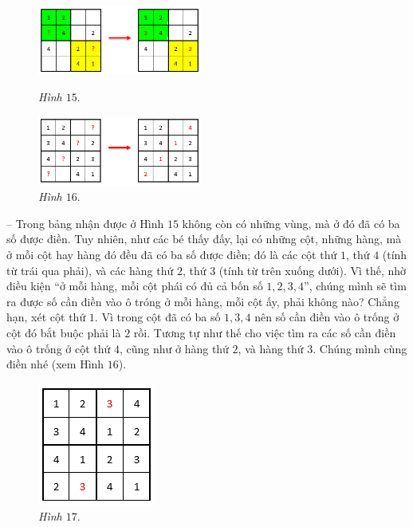 		\begin{figure}
			\centering
			\captionsetup{labelformat= empty, justification=centering}
			\includegraphics[width=0.48\textwidth]{pic4}
			\caption{\small\textit{Hình $15.$}}
			
			\includegraphics[width=0.48\textwidth]{pic5}
			\caption{\small\textit{Hình $16.$}}
			\vspace*{-10pt}
		\end{figure}
	-- Trong bảng nhận được ở Hình $15$ không còn có những vùng, mà ở đó đã có ba số được điền. Tuy nhiên, như các bé thấy đấy, lại có những cột, những hàng, mà ở mỗi cột hay hàng đó đều đã có ba số được điền; đó là các cột thứ $1$, thứ $4$ (tính từ trái qua phải), và các hàng thứ $2$, thứ $3$ (tính từ trên xuống dưới). Vì thế, nhờ điều kiện “ở mỗi hàng, mỗi cột phái có đủ cả bốn số $1, 2, 3, 4$”, chúng mình sẽ tìm ra được số cần điền vào ô tróng ở mỗi hàng, mỗi cột ấy, phải không nào? Chẳng hạn, xét cột thứ $1$. Vì trong cột đã có ba số $1, 3, 4$ nên số cần điền vào ô trống ở cột đó bắt buộc phải là $2$ rồi. Tương tự như thế cho việc tìm ra các số cần điền vào ô trống ở cột thứ $4$, cũng như ở hàng thứ $2$, và hàng thứ $3$. Chúng mình cùng điền nhé (xem Hình $16$).
	\vskip 0.1cm
	\begin{figure}
		\centering
		\vspace*{-5pt}
		\captionsetup{labelformat= empty, justification=centering}
		\includegraphics[scale=0.8]{pic6}
		\caption{\small\textit{Hình $17.$}}
		\vspace*{-15pt}
	\end{figure}
